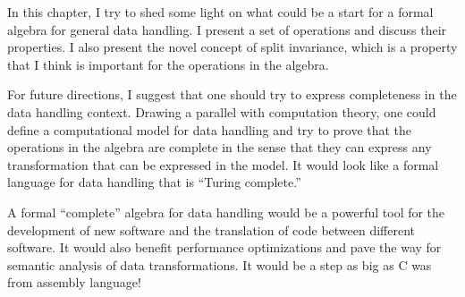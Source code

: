 In this chapter, I try to shed some light on what could be a start for a formal algebra
for general data handling.  I present a set of operations and discuss their properties. I
also present the novel concept of split invariance, which is a property that I think is
important for the operations in the algebra.

For future directions, I suggest that one should try to express completeness in the data
handling context.  Drawing a parallel with computation theory, one could define a
computational model for data handling and try to prove that the operations in the algebra
are complete in the sense that they can express any transformation that can be expressed
in the model.  It would look like a formal language for data handling that is ``Turing
complete.''

A formal ``complete'' algebra for data handling would be a powerful tool for the
development of new software and the translation of code between different software.  It
would also benefit performance optimizations and pave the way for semantic analysis of
data transformations.  It would be a step as big as C was from assembly language!

